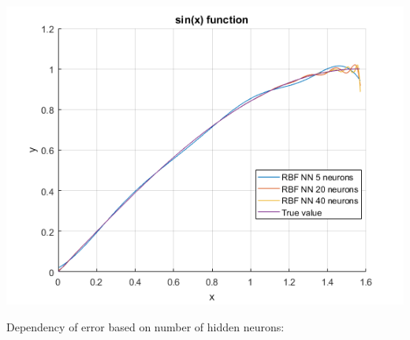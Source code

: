 \documentclass[a4paper, 12pt]{article}
\begin{document}
\begin{enumerate}
\includegraphics[scale = 0.8]{f4.png}


\end{enumerate}

Dependency of error based on number of hidden neurons:
\end{document}
